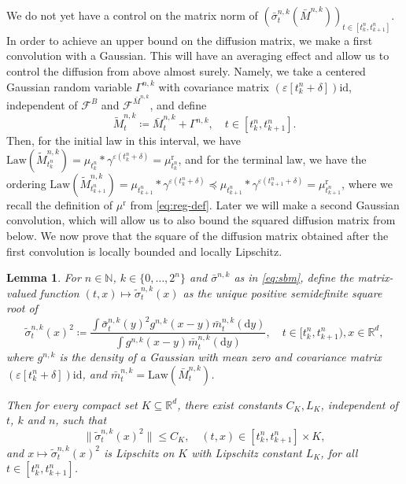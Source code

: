 \documentclass[12pt,oneside]{amsart}
\newtheorem{lemma}[theorem]{Lemma}
\theoremstyle{definition}
\newcommand{\F}{\mathcal F}
\newcommand{\Law}{\mathrm{Law}}
\newcommand{\id}{\mathrm{id}}
\newcommand{\D}{\mathrm{d}}
\newcommand{\N}{\mathbb N}
\newcommand{\R}{\mathbb R}
\newcommand{\reg}{\mathrm{r}}
\def\R{{\mathbb R}}
\numberwithin{equation}{section}
\begin{document}
We do not yet have a control on the matrix norm of $(\bar{\sigma}^{n, k}_t(\bar{M}^{n, k}))_{t \in [t^n_k, t^n_{k + 1}]}$. In order to achieve an upper bound on the diffusion matrix, we make a first convolution with a Gaussian. This will have an averaging effect and allow us to control the diffusion from above almost surely. Namely, we take a centered Gaussian random variable $\Gamma^{n, k}$ with covariance matrix $(\varepsilon[t^n_k + \delta]) \id$, independent of $\F^B$ and $\F^{\bar{M}^{n, k}}$, and define
\begin{equation}\label{eq:sum-independent-gaussian}
	\tilde M^{n, k}_t \coloneqq \bar{M}^{n, k}_t + \Gamma^{n, k}, \quad t \in [t^n_k, t^n_{k +1}].
\end{equation}
Then, for the initial law in this interval, we have $\Law(\tilde{M}^{n, k}_{t^n_k}) = \mu_{t^n_k} \ast \gamma^{\varepsilon(t^n_k + \delta)} = \mu^\reg_{t^n_k}$, and for the terminal law, we have the ordering $\Law(\tilde{M}^{n, k}_{t^n_{k+1}}) = \mu_{t^n_{k+1}} \ast \gamma^{\varepsilon(t^n_k + \delta)} \preceq \mu_{t^n_{k+1}} \ast \gamma^{\varepsilon(t^n_{k+1} + \delta)} = \mu^\reg_{t^n_{k + 1}}$, where we recall the definition of $\mu^\reg$ from \eqref{eq:reg-def}. Later we will make a second Gaussian convolution, which will allow us to also bound the squared diffusion matrix from below. We now prove that the square of the diffusion matrix obtained after the first convolution is locally bounded and locally Lipschitz.

\begin{lemma}\label{lem:markov-mixing}
	For $n \in \N$, $k \in \{0, \dotsc, 2^n\}$ and $\bar \sigma^{n, k}$ as in \eqref{eq:sbm}, define the matrix-valued function $(t, x) \mapsto \tilde{\sigma}^{n, k}_t(x)$ as the unique positive semidefinite square root of
	\begin{equation}\label{eq:sigma-mixed}
		\tilde{\sigma}^{n, k}_t(x)^2 \coloneqq \frac{\int \bar \sigma^{n, k}_t(y)^2 g^{n, k}(x - y) \bar{m}^{n, k}_t(\D y)}{\int g^{n, k}(x - y)\bar{m}^{n, k}_t(\D y)}, \quad t \in [t^n_k, t^n_{k + 1}), x \in \R^d,
	\end{equation}
	where $g^{n, k}$ is the density of a Gaussian with mean zero and covariance matrix $(\varepsilon[t^n_k + \delta])\id$, and $\bar{m}^{n, k}_t = \Law(\bar{M}^{n, k}_t)$.
	
	Then for every compact set $K \subseteq \R^d$, there exist constants $C_K, L_K$, independent of $t$, $k$ and $n$, such that
	\begin{equation}
		\lVert \tilde{\sigma}^{n, k}_t(x)^2 \rVert \leq C_K, \quad (t, x) \in [t^n_k, t^n_{k +1}] \times K,
	\end{equation}
	and $x \mapsto \tilde{\sigma}^{n, k}_t(x)^2$ is Lipschitz on $K$ with Lipschitz constant $L_K$, for all $t \in [t^n_k, t^n_{k + 1}]$.
\end{lemma}
\end{document}
